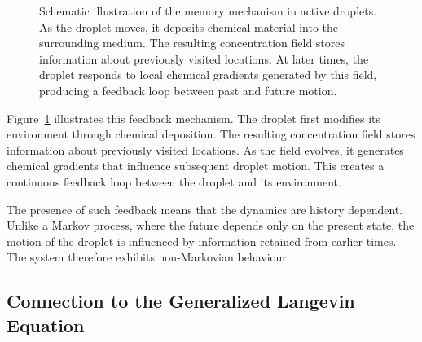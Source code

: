 \begin{figure}[htbp]
\centering
{}

\caption{
Schematic illustration of the memory mechanism\cite{droplet2025} in active droplets.
As the droplet moves, it deposits chemical material into the surrounding
medium. The resulting concentration field stores information about
previously visited locations. At later times, the droplet responds to
local chemical gradients generated by this field, producing a feedback
loop between past and future motion.
}
\label{fig:memory_loop}
\end{figure}

Figure~\ref{fig:memory_loop} illustrates this feedback mechanism. The
droplet first modifies its environment through chemical deposition. The
resulting concentration field stores information about previously visited
locations. As the field evolves, it generates chemical gradients that
influence subsequent droplet motion. This creates a continuous feedback
loop between the droplet and its environment.

The presence of such feedback means that the dynamics are history
dependent\cite{balakrishnan2021,droplet2025}. Unlike a Markov process, where the future depends only on the
present state, the motion of the droplet is influenced by information
retained from earlier times. The system therefore exhibits
non-Markovian behaviour.

\subsection{Connection to the Generalized Langevin Equation}

